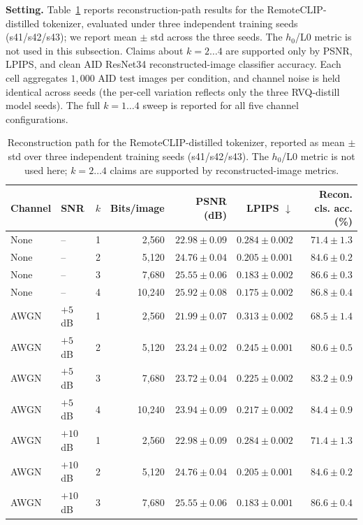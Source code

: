 \documentclass[lettersize,journal]{IEEEtran}
\begin{document}
\textbf{Setting.} Table~\ref{tab:recon_path} reports reconstruction-path results for the RemoteCLIP-distilled tokenizer, evaluated under three independent training seeds (s41/s42/s43); we report mean $\pm$ std across the three seeds. The $h_0$/L0 metric is not used in this subsection. Claims about $k=2\ldots4$ are supported only by PSNR, LPIPS, and clean AID ResNet34 reconstructed-image classifier accuracy. Each cell aggregates $1{,}000$ AID test images per condition, and channel noise is held identical across seeds (the per-cell variation reflects only the three RVQ-distill model seeds). The full $k=1\ldots4$ sweep is reported for all five channel configurations.

\begin{table}[!t]
\centering
\caption{Reconstruction path for the RemoteCLIP-distilled tokenizer, reported as mean $\pm$ std over three independent training seeds (s41/s42/s43). The $h_0$/L0 metric is not used here; $k=2\ldots4$ claims are supported by reconstructed-image metrics.}
\label{tab:recon_path}
\begin{tabular}{@{}llrrrrr@{}}
\toprule
Channel & SNR & $k$ & Bits/image & PSNR (dB) & LPIPS $\downarrow$ & Recon. cls. acc. (\%) \\
\midrule
None & -- & 1 & 2{,}560 & $22.98\pm0.09$ & $0.284\pm0.002$ & $71.4\pm1.3$ \\
None & -- & 2 & 5{,}120 & $24.76\pm0.04$ & $0.205\pm0.001$ & $84.6\pm0.2$ \\
None & -- & 3 & 7{,}680 & $25.55\pm0.06$ & $0.183\pm0.002$ & $86.6\pm0.3$ \\
None & -- & 4 & 10{,}240 & $25.92\pm0.08$ & $0.175\pm0.002$ & $86.8\pm0.4$ \\
\midrule
AWGN & $+5$ dB & 1 & 2{,}560 & $21.99\pm0.07$ & $0.313\pm0.002$ & $68.5\pm1.4$ \\
AWGN & $+5$ dB & 2 & 5{,}120 & $23.24\pm0.02$ & $0.245\pm0.001$ & $80.6\pm0.5$ \\
AWGN & $+5$ dB & 3 & 7{,}680 & $23.72\pm0.04$ & $0.225\pm0.002$ & $83.2\pm0.9$ \\
AWGN & $+5$ dB & 4 & 10{,}240 & $23.94\pm0.09$ & $0.217\pm0.002$ & $84.4\pm0.9$ \\
\midrule
AWGN & $+10$ dB & 1 & 2{,}560 & $22.98\pm0.09$ & $0.284\pm0.002$ & $71.4\pm1.3$ \\
AWGN & $+10$ dB & 2 & 5{,}120 & $24.76\pm0.04$ & $0.205\pm0.001$ & $84.6\pm0.2$ \\
AWGN & $+10$ dB & 3 & 7{,}680 & $25.55\pm0.06$ & $0.183\pm0.001$ & $86.6\pm0.4$ \\

\end{tabular}
\end{table}
\end{document}
